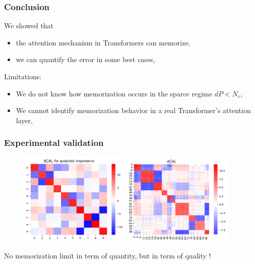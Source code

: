 \documentclass{beamer}
\begin{document}
\begin{frame}
    \frametitle{Conclusion}
    We showed that 
    \begin{itemize}
        \item the attention mechanism in Transformers can memorize,
        \item we can quantify the error in some best cases,
    \end{itemize}
    \bigbreak

    Limitations:
    \begin{itemize}
        \item We do not know how memorization occurs in the sparce regime $dP < N_{\varepsilon}$,
        \item We cannot identify memorization behavior in a real Transformer's attention layer, 
    \end{itemize}
\end{frame}

\begin{frame}
    \frametitle{Experimental validation}

    \begin{figure}
        \includegraphics[width = 0.47\textwidth]{Uniform W_U.png}
        \includegraphics[width = 0.47\textwidth]{Uniform W_E.png}
    \end{figure}

    No memorization limit in term of quantity, but in term of quality !

\end{frame}
\end{document}

